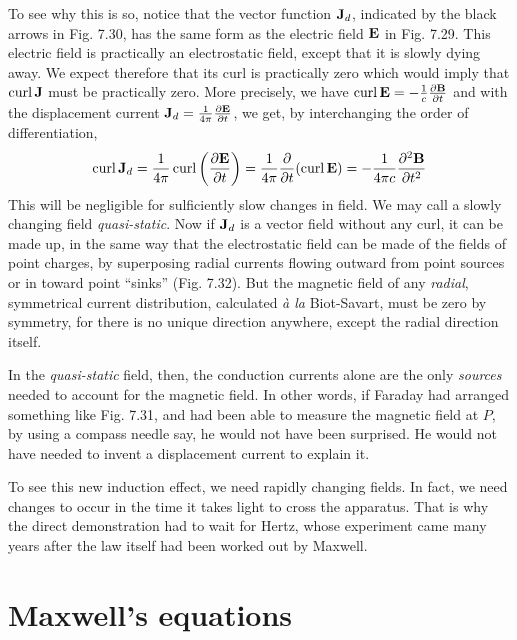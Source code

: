 To see why this is so, notice that the vector function $\mathbf{J}_d$, indicated
by the black arrows in Fig. 7.30, has the same form as the electric
field $\mathbf{E}$ in Fig. 7.29. This electric field is practically an electrostatic
field, except that it is slowly dying away. We expect therefore that
its curl is practically zero which would imply that $\operatorname{curl}\mathbf{J}$ must be
practically zero. More precisely, we have $\operatorname{curl}\mathbf{E} = -\frac{1}{c}\frac{\partial\mathbf{B}}{\partial t}$ and
with the displacement current $\mathbf{J}_d=\frac{1}{4\pi}\frac{\partial\mathbf{E}}{\partial t}$,
we get, by interchanging the order of differentiation,
\begin{equation}
  \operatorname{curl} \mathbf{J}_d = \frac{1}{4\pi}\operatorname{curl}\left(\frac{\partial\mathbf{E}}{\partial t}\right)
        = \frac{1}{4\pi}\frac{\partial}{\partial t}(\operatorname{curl}\mathbf{E})
        = -\frac{1}{4\pi c}\frac{\partial^2\mathbf{B}}{\partial t^2}
\end{equation}
This will be negligible for sulficiently slow changes in field. We
may call a slowly changing field \emph{quasi-static}.
Now if $\mathbf{J}_d$ is a vector
field without any curl, it can be made up, in the same way that the
electrostatic field can be made of the fields of point charges, by superposing
radial currents flowing outward from point sources or in
toward point ``sinks'' (Fig. 7.32). But the magnetic field of any
\emph{radial}, symmetrical current distribution, calculated \emph{\`a la} Biot-Savart,
must be zero by symmetry, for there is no unique direction anywhere,
except the radial direction itself.

In the \emph{quasi-static} field, then, the conduction currents alone are
the only \emph{sources} needed to account for the magnetic field. In other
words, if Faraday had arranged something like Fig. 7.31, and had
been able to measure the magnetic field at $P$, by using a compass
needle say, he would not have been surprised. He would not have
needed to invent a displacement current to explain it.


To see this new induction effect, we need rapidly changing fields.
In fact, we need changes to occur in the time it takes light to cross
the apparatus. That is why the direct demonstration had to wait for
Hertz, whose experiment came many years after the law itself had
been worked out by Maxwell.

\iffalse

\section{Maxwell's equations}

